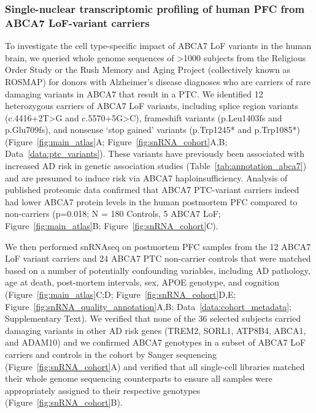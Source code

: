 \subsubsection{Single-nuclear transcriptomic profiling of human PFC from ABCA7 LoF-variant carriers} 
To investigate the cell type-specific impact of ABCA7 LoF variants in the human brain, we queried whole genome sequences of >1000 subjects from the Religious Order Study or the Rush Memory and Aging Project (collectively known as ROSMAP) for donors with Alzheimer’s disease diagnoses who are carriers of rare damaging variants in ABCA7 that result in a PTC. We identified 12 heterozygous carriers of ABCA7 LoF variants, including splice region variants (c.4416+2T>G and c.5570+5G>C), frameshift variants (p.Leu1403fs and p.Glu709fs), and nonsense ‘stop gained’ variants (p.Trp1245* and p.Trp1085*) (Figure~\ref{fig:main_atlas}A; Figure~\ref{fig:snRNA_cohort}A,B; Data~\ref{data:ptc_variants}). These variants have previously been associated with increased AD risk in genetic association studies (Table~\ref{tab:annotation_abca7})\cite{Steinberg2015-mu,Holstege2022-vp} and are presumed to induce risk via ABCA7 haploinsufficiency\cite{Duchateau2024-rf}. Analysis of published proteomic data\cite{Johnson2020-ip} confirmed that ABCA7 PTC-variant carriers indeed had lower ABCA7 protein levels in the human postmortem PFC compared to non-carriers (p=0.018; N = 180 Controls, 5 ABCA7 LoF; Figure~\ref{fig:main_atlas}B; Figure~\ref{fig:snRNA_cohort}C). 

We then performed snRNAseq on postmortem PFC samples from the 12 ABCA7 LoF variant carriers and 24 ABCA7 PTC non-carrier controls that were matched based on a number of potentially confounding variables, including AD pathology, age at death, post-mortem intervals, sex, APOE genotype, and cognition (Figure~\ref{fig:main_atlas}C;D; Figure~\ref{fig:snRNA_cohort}D,E; Figure~\ref{fig:snRNA_quality_annotation}A,B; Data~\ref{data:cohort_metadata}; Supplementary Text). We verified that none of the 36 selected subjects carried damaging variants in other AD risk genes (TREM2, SORL1, ATP8B4, ABCA1, and ADAM10)\cite{Holstege2022-vp} and we confirmed ABCA7 genotypes in a subset of ABCA7 LoF carriers and controls in the cohort by Sanger sequencing (Figure~\ref{fig:snRNA_cohort}A) and verified that all single-cell libraries matched their whole genome sequencing counterparts to ensure all samples were appropriately assigned to their respective genotypes (Figure~\ref{fig:snRNA_cohort}B).

